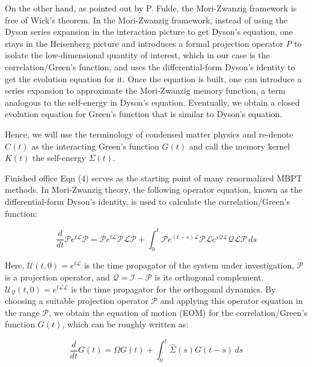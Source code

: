 \documentclass[12pt]{article}
\begin{document}
On the other hand, as pointed out by P. Fulde, the Mori-Zwanzig framework is free of Wick’s theorem. In the Mori-Zwanzig framework, instead of using the Dyson series expansion in the interaction picture to get Dyson’s equation, one stays in the Heisenberg picture and introduces a formal projection operator \( P \) to isolate the low-dimensional quantity of interest, which in our case is the correlation/Green’s function, and uses the differential-form Dyson’s identity to get the evolution equation for it. Once the equation is built, one can introduce a series expansion to approximate the Mori-Zwanzig memory function, a term analogous to the self-energy in Dyson’s equation. Eventually, we obtain a closed evolution equation for Green’s function that is similar to Dyson’s equation.

Hence, we will use the terminology of condensed matter physics and re-denote \( C(t) \) as the interacting Green’s function \( G(t) \) and call the memory kernel \( K(t) \) the self-energy \( \Sigma(t) \).

Finished office
Eqn (4) serves as the starting point of many renormalized MBPT methods. In Mori-Zwanzig theory, the following operator equation, known as the differential-form Dyson's identity, is used to calculate the correlation/Green's function:

\begin{equation}
\frac{d}{d t} \mathcal{P} e^{t \mathcal{L}} \mathcal{P}=\mathcal{P} e^{t \mathcal{L}} \mathcal{P} \mathcal{L} \mathcal{P}+\int_0^t \mathcal{P} e^{(t-s) \mathcal{L}} \mathcal{P} \mathcal{L} e^{s \mathcal{Q} \mathcal{L}} \mathcal{Q L} \mathcal{P} \, ds
\end{equation}

Here, \( \mathcal{U}(t, 0)=e^{t \mathcal{L}} \) is the time propagator of the system under investigation, \( \mathcal{P} \) is a projection operator, and \( \mathcal{Q}=\mathcal{I}-\mathcal{P} \) is its orthogonal complement. \( \mathcal{U}_{\mathcal{Q}}(t, 0)=e^{t \mathcal{L} \mathcal{L}} \) is the time propagator for the orthogonal dynamics. By choosing a suitable projection operator \( \mathcal{P} \) and applying this operator equation in the range \( \mathcal{P} \), we obtain the equation of motion (EOM) for the correlation/Green's function \( G(t) \), which can be roughly written as:

\begin{equation}
\frac{d}{d t} G(t)=\Omega G(t)+\int_0^t \hat{\Sigma}(s) G(t-s) \, ds
\end{equation}
\end{document}
